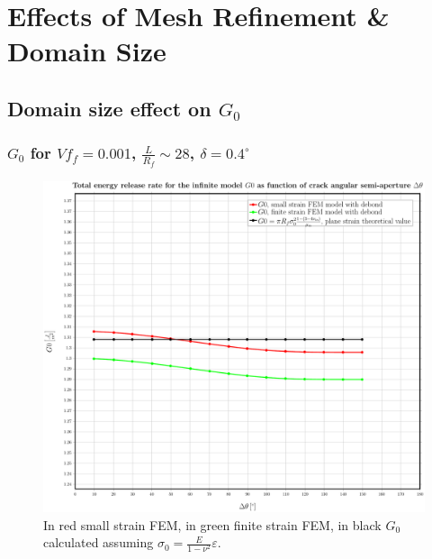 \documentclass[first,firstsupp,lastsupp,last,hyperref,table]{ETHclass}
\begin{document}
\section[Mesh \& Domain Size]{Effects of Mesh Refinement \& Domain Size}

\subsection{Domain size effect on $G_{0}$}

\begin{frame}
\frametitle{\small $G_{0}$ for $Vf_{f}=0.001$, $\frac{L}{R_{f}}\sim 28$, $\delta=0.4^{\circ}$}
\vspace{-0.5cm}
\begin{figure}
\includegraphics[height=0.7\textheight]{2017-06-23_AbqRunSummary_SingleFiberEqRfSmallFiniteStrain_G0_Summary.pdf}
 \caption{In red small strain FEM, in green finite strain FEM, in black $G_{0}$ calculated assuming $\sigma_{0}=\frac{E}{1-\nu^ 2}\varepsilon$.}
  \label{fig:jintegral}
\end{figure}
\end{frame}
\end{document}
